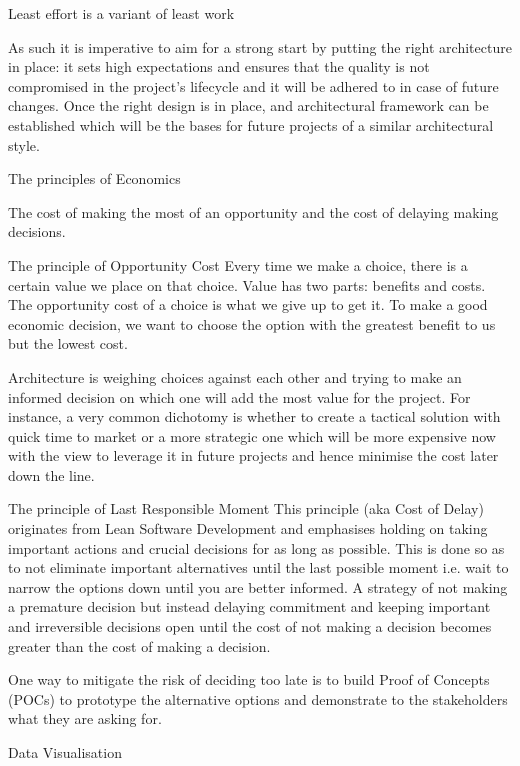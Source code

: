 Least effort is a variant of least work

As such it is imperative to aim for a strong start by putting the right architecture in place: it sets high expectations and ensures that the quality is not compromised in the project’s lifecycle and it will be adhered to in case of future changes. Once the right design is in place, and architectural framework can be established which will be the bases for future projects of a similar architectural style.


The principles of Economics

The cost of making the most of an opportunity and the cost of delaying making decisions.

The principle of Opportunity Cost
Every time we make a choice, there is a certain value we place on that choice. Value has two parts: benefits and costs. The opportunity cost of a choice is what we give up to get it. To make a good economic decision, we want to choose the option with the greatest benefit to us but the lowest cost. \cite{Raymond2003}

Architecture is weighing choices against each other and trying to make an informed decision on which one will add the most value for the project. For instance, a very common dichotomy is whether to create a tactical solution with quick time to market or a more strategic one which will be more expensive now with the view to leverage it in future projects and hence minimise the cost later down the line.

The principle of Last Responsible Moment
This principle (aka Cost of Delay) originates from Lean Software Development \cite{Dombrowski2014} and emphasises holding on taking important actions and crucial decisions for as long as possible. This is done so as to not eliminate important alternatives until the last possible moment i.e. wait to narrow the options down until you are better informed.
A strategy of not making a premature decision but instead delaying commitment and keeping important and irreversible decisions open until the cost of not making a decision becomes greater than the cost of making a decision.

One way to mitigate the risk of deciding too late is to build Proof of Concepts (POCs) to prototype the alternative options and demonstrate to the stakeholders what they are asking for.



Data Visualisation

